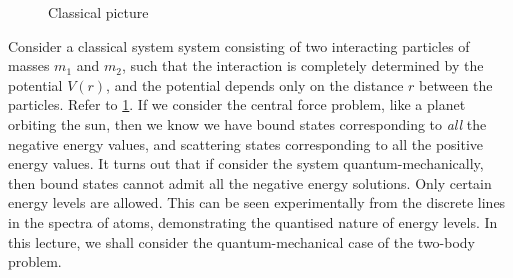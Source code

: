 \documentclass[12pt, a4 paper]{article}
\theoremstyle{definition}
\begin{document}
    \begin{figure}
        \centering
        \caption{Classical picture}\label{fig:twobody}
    \end{figure}
    Consider a classical system system consisting of two interacting particles of masses \(m_1\) and \(m_2\), such that the interaction is completely determined by the potential $V(r)$, and the potential depends only on the distance $r$ between the particles. Refer to \cref{fig:twobody}. If we consider the central force problem, like a planet orbiting the sun, then we know we have bound states corresponding to \textit{all} the negative energy values, and scattering states corresponding to all the positive energy values. It turns out that if consider the system quantum-mechanically, then bound states cannot admit all the negative energy solutions. Only certain energy levels are allowed. This can be seen experimentally from the discrete lines in the spectra of atoms, demonstrating the quantised nature of energy levels. In this lecture, we shall consider the quantum-mechanical case of the two-body problem.
\end{document}
